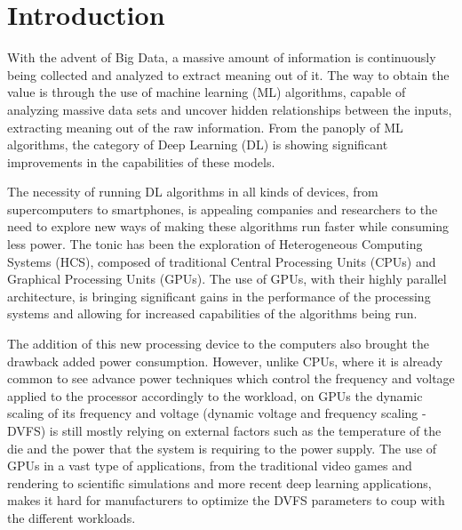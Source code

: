 
\chapter{Introduction}
\label{chapter:introduction}

With the advent of Big Data, a massive amount of information is continuously being collected and analyzed to extract meaning out of it. The way to obtain the value is through the use of machine learning (ML) algorithms, capable of analyzing massive data sets and uncover hidden relationships between the inputs, extracting meaning out of the raw information. From the panoply of ML algorithms, the category of Deep Learning (DL) is showing significant improvements in the capabilities of these models. 

The necessity of running DL algorithms in all kinds of devices, from supercomputers to smartphones, is appealing companies and researchers to the need to explore new ways of making these algorithms run faster while consuming less power. The tonic has been the exploration of Heterogeneous Computing Systems (HCS), composed of traditional Central Processing Units (CPUs) and Graphical Processing Units (GPUs). The use of GPUs, with their highly parallel architecture, is bringing significant gains in the performance of the processing systems and allowing for increased capabilities of the algorithms being run. 

The addition of this new processing device to the computers also brought the drawback added power consumption. However, unlike CPUs, where it is already common to see advance power techniques which control the frequency and voltage applied to the processor accordingly to the workload, on GPUs the dynamic scaling of its frequency and voltage (dynamic voltage and frequency scaling - DVFS) is still mostly relying on external factors such as the temperature of the die and the power that the system is requiring to the power supply. The use of GPUs in a vast type of applications, from the traditional video games and rendering to scientific simulations and more recent deep learning applications, makes it hard for manufacturers to optimize the DVFS parameters to coup with the different workloads.

